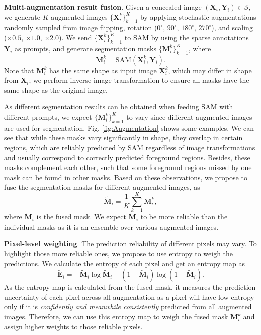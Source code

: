 \noindent\textbf{Multi-augmentation result fusion}. Given a concealed image $(\mathbf{X}_i, \mathbf{Y}_i)\in\mathcal{S}$, we generate $K$ augmented images $\{\mathbf{X}^k_i\}^K_{k=1}$ by applying stochastic augmentations randomly sampled from image flipping, rotation ($0^{\circ}$, $90^{\circ}$, $180^{\circ}$, $270^{\circ}$), and scaling ($\times0.5$, $\times1.0$, $\times2.0$). 
We send $\{\mathbf{X}^k_i\}^K_{k=1}$ to SAM by using the sparse annotations $\mathbf{Y}_i$ as prompts, and generate segmentation masks $\{\mathbf{M}^k_i\}^K_{k=1}$, where 
\begin{equation}
    \mathbf{M}_i^k=\mathrm{SAM}\left(\mathbf{X}^k_i, \mathbf{Y}_i \right).
\end{equation}
Note that $\mathbf{M}_i^k$ has the same shape as input image $\mathbf{X}^k_i$, which may differ in shape from $\mathbf{X}_i$; we perform inverse image transformation to ensure all masks have the same shape as the original image. 

As different segmentation results can be obtained when feeding SAM with different prompts, we expect $\{\mathbf{M}^k_i\}^K_{k=1}$ to vary since different augmented images are used for segmentation. Fig. \ref{fig:Augmentation} shows some examples. We can see that while these masks vary significantly in shape, they overlap in certain regions, which are reliably predicted by SAM regardless of image transformations and usually correspond to correctly predicted foreground regions. Besides, these masks complement each other, such that some foreground regions missed by one mask can be found in other masks. Based on these observations, we propose to fuse the segmentation masks for different augmented images, as
\begin{equation}
    \tilde{\mathbf{M}}_i = \frac{1}{K}\sum_{k=1}^K \mathbf{M}^k_i,
    \label{Eq:RefinedPL}
\end{equation}
where $\tilde{\mathbf{M}}_i$ is the fused mask. We expect $\tilde{\mathbf{M}}_i$ to be more reliable than the individual masks as it is an ensemble over various augmented images. 

\noindent\textbf{Pixel-level weighting}. 
The prediction reliability of different pixels may vary. To highlight those more reliable ones, we propose to use entropy to weigh the predictions.   
We calculate the entropy of each pixel and get an entropy map as  
\begin{equation}
    \tilde{\mathbf{E}}_i = -\tilde{\mathbf{M}}_i \log \tilde{\mathbf{M}}_i -(1-\tilde{\mathbf{M}}_i) \log (1-\tilde{\mathbf{M}}_i).
    \label{Eq:entropy}
\end{equation}
As the entropy map is calculated from the fused mask, it measures the prediction uncertainty of each pixel across all augmentation as a pixel will have low entropy only if it is \textit{confidently and meanwhile consistently} predicted from all augmented images. Therefore, we can use this entropy map to weigh the fused mask $\mathbf{M}_i^k$ and assign higher weights to those reliable pixels.  

